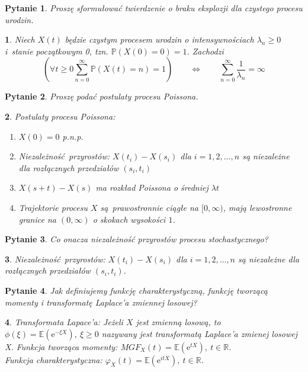 \documentclass[10pt]{mwart}
\theoremstyle{plain}
\newtheorem{pytanie}{Pytanie}
\theoremstyle{break}
\newtheorem*{odpowiedź}{}
\newcommand*{\e}{\mathrm{e}}
\begin{document}
\begin{pytanie}
Proszę sformułować twierdzenie o braku eksplozji dla czystego procesu urodzin.
\end{pytanie}
\begin{odpowiedź}
    Niech $X(t)$ będzie czystym procesem urodzin
    o intensywnościach $\lambda_n \geq 0$ i~stanie początkowym 0,
    tzn. $\mathbb{P}(X(0)=0)=1$. Zachodzi \[
        \left(\forall t \geq 0 \sum_{n = 0}^\infty
        \mathbb{P}(X(t)=n)=1\right) \qquad \iff \qquad
        \sum_{n = 0}^\infty \frac 1 {\lambda_n} = \infty
    \] 
\end{odpowiedź}


\begin{pytanie}
Proszę podać postulaty procesu Poissona.
\end{pytanie}
\begin{odpowiedź}
    Postulaty procesu Poissona:
    \begin{enumerate}
        \item $X(0) = 0$ p.n.p.
        \item Niezależność przyrostów:
            $X(t_i)-X(s_i)$ dla $i=1,2,\ldots,n$
            są niezależne dla rozłącznych przedziałów $(s_i,t_i)$
        \item $X(s+t)-X(s)$ ma rozkład Poissona o średniej $\lambda t$
        \item Trajektorie procesu $X$ są prawostronnie ciągłe
            na $[0, \infty)$, mają lewostronne granice na $(0, \infty )$
            o skokach wysokości $1$.
    \end{enumerate}
\end{odpowiedź}


\begin{pytanie}
Co onacza niezależność przyrostów procesu stochastycznego?
\end{pytanie}
\begin{odpowiedź}
    Niezależność przyrostów:
    $X(t_i)-X(s_i)$ dla $i=1,2,\ldots,n$
    są niezależne dla rozłącznych przedziałów $(s_i,t_i)$.
\end{odpowiedź}


\begin{pytanie}
Jak definiujemy funkcję charakterystyczną, funkcję tworzącą momenty i transformatę Laplace'a zmiennej losowej?
\end{pytanie}
\begin{odpowiedź}
    Transformata Lapace'a: Jeżeli $X$ jest zmienną losową, to $\phi (\xi) = \mathbb{E}(\e^{-\xi X}), \ \xi \geq 0$ nazywany jest transformatą Laplace'a zmienej losowej X.
    Funkcja tworząca momenty: $MGF_X(t) = \mathbb{E} (\e^{tX}), \ t \in \mathbb{R}$. \\
    Funkcja charakterystyczna: $\varphi_X(t) = \mathbb{E} (\e^{itX}), \ t \in \mathbb{R}$. \\
\end{odpowiedź}
\end{document}
